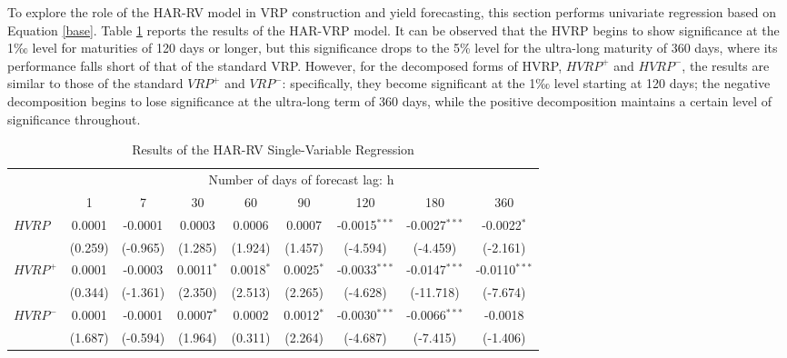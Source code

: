 \documentclass[a4paper, 12pt]{article}    %
\begin{document}
To explore the role of the HAR-RV model in VRP construction and yield forecasting, this section performs univariate regression based on Equation \ref{base}. Table \ref{HARresult} reports the results of the HAR-VRP model. It can be observed that the HVRP begins to show significance at the 1‰ level for maturities of 120 days or longer, but this significance drops to the 5\% level for the ultra-long maturity of 360 days, where its performance falls short of that of the standard VRP. However, for the decomposed forms of HVRP, $HVRP^+$ and $HVRP^-$, the results are similar to those of the standard $VRP^+$ and $VRP^-$: specifically, they become significant at the 1‰ level starting at 120 days; the negative decomposition begins to lose significance at the ultra-long term of 360 days, while the positive decomposition maintains a certain level of significance throughout.


\begin{table}[htbp]
\centering
\footnotesize %
\caption{Results of the HAR-RV Single-Variable Regression}
\label{HARresult}
\renewcommand{\arraystretch}{1.3} %
\begin{tabular}{lcccccccc}
\toprule
&\multicolumn{8}{c}{Number of days of forecast lag: h}\\
\cmidrule(lr){2-9}
& 1    & 7    & 30   &  60  & 90   & 120  & 180  & 360 \\
\midrule
$HVRP$    & 0.0001 & -0.0001 & 0.0003  & 0.0006  & 0.0007  & -0.0015$^{***}$ & -0.0027$^{***}$ & -0.0022$^{*}$  \\
          & (0.259) & (-0.965) & (1.285) & (1.924) & (1.457) & (-4.594) & (-4.459) & (-2.161) \\
$HVRP^+$ & 0.0001 & -0.0003 & 0.0011$^{*}$ & 0.0018$^{*}$ & 0.0025$^{*}$ & -0.0033$^{***}$ & -0.0147$^{***}$ & -0.0110$^{***}$ \\
          & (0.344) & (-1.361) & (2.350) & (2.513) & (2.265) & (-4.628) & (-11.718) & (-7.674) \\
$HVRP^-$ & 0.0001 & -0.0001  & 0.0007$^{*}$ & 0.0002  & 0.0012$^{*}$ & -0.0030$^{***}$ & -0.0066$^{***}$ & -0.0018   \\
          & (1.687) & (-0.594) & (1.964) & (0.311) & (2.264) & (-4.687) & (-7.415) & (-1.406) \\
\bottomrule
\end{tabular}
\end{table}
\end{document}
